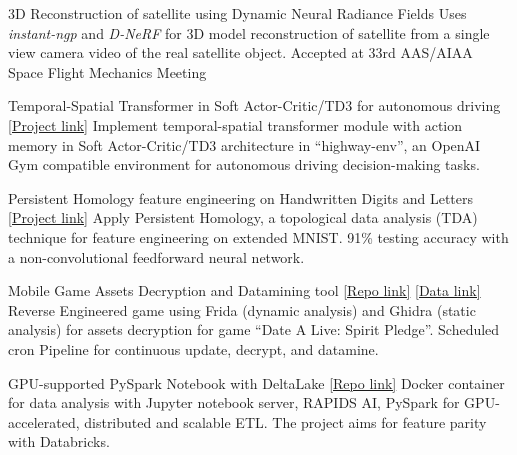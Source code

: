 \vspace{-4mm}
\vspace{-2mm}

\begin{cventries}


	\cventry
	{}
	{3D Reconstruction of satellite using Dynamic Neural Radiance Fields}
	{}
	{}
	{Uses \emph{instant-ngp} and \emph{D-NeRF} for 3D model reconstruction of satellite from a single view camera video of the real satellite object. Accepted at 33rd AAS/AIAA Space Flight Mechanics Meeting}

	\cventry
	{}
	{Temporal-Spatial Transformer in Soft Actor-Critic/TD3 for autonomous driving}
	{\href{https://github.com/sesem738/Lavenza}{[Project link]}}
	{}
	{Implement temporal-spatial transformer module with action memory in Soft Actor-Critic/TD3 architecture in ``highway-env'', an OpenAI Gym compatible environment for autonomous driving decision-making tasks.}

	\cventry
	{}
	{Persistent Homology feature engineering on Handwritten Digits and Letters}
	{\href{https://colab.research.google.com/drive/18z161k3diYO6sNVBfiKH8uGqbrekxMPN?usp=sharing}{[Project link]}}
	{}
	{Apply Persistent Homology, a topological data analysis (TDA) technique for feature engineering on extended MNIST. 91\% testing accuracy with a non-convolutional feedforward neural network.}

	\cventry
	{}
	{Mobile Game Assets Decryption and Datamining tool}
	{\href{https://github.com/n0k0m3/DALSP-Assets-Decryption-tool}{[Repo link]} \href{https://github.com/n0k0m3/DateALiveData}{[Data link]}}
	{}
	{Reverse Engineered game using Frida (dynamic analysis) and Ghidra (static analysis) for assets decryption for game ``Date A Live: Spirit Pledge''. Scheduled cron Pipeline for continuous update, decrypt, and datamine.}

	\cventry
	{}
	{GPU-supported PySpark Notebook with DeltaLake}
	{\href{https://github.com/n0k0m3/pyspark-notebook-deltalake-docker}{[Repo link]}}
	{}
	{Docker container for data analysis with Jupyter notebook server, RAPIDS AI, PySpark for GPU-accelerated, distributed and scalable ETL. The project aims for feature parity with Databricks.}


\end{cventries}
